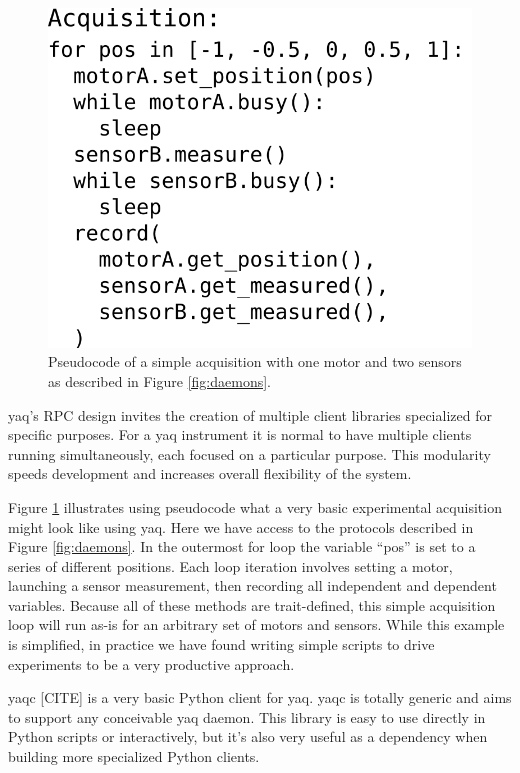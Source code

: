 \documentclass[aip, amsmath, amssymb, reprint,]{revtex4-1}
\begin{document}
\begin{figure}
  \label{fig:acquisition}
  \includegraphics[width=\columnwidth]{./figures/acquisition.png}
	\caption{Pseudocode of a simple acquisition with one motor and two sensors as described in Figure \ref{fig:daemons}.}
\end{figure}

yaq's RPC design invites the creation of multiple client libraries specialized for specific purposes.
For a yaq instrument it is normal to have multiple clients running simultaneously, each focused on a particular purpose.
This modularity speeds development and increases overall flexibility of the system.

Figure \ref{fig:acquisition} illustrates using pseudocode what a very basic experimental acquisition might look like using yaq.
Here we have access to the protocols described in Figure \ref{fig:daemons}.
In the outermost for loop the variable ``pos'' is set to a series of different positions.
Each loop iteration involves setting a motor, launching a sensor measurement, then recording all independent and dependent variables.
Because all of these methods are trait-defined, this simple acquisition loop will run as-is for an arbitrary set of motors and sensors.
While this example is simplified, in practice we have found writing simple scripts to drive experiments to be a very productive approach.

yaqc [CITE] is a very basic Python client for yaq.
yaqc is totally generic and aims to support any conceivable yaq daemon.
This library is easy to use directly in Python scripts or interactively, but it's also very useful as a dependency when building more specialized Python clients.
\end{document}
